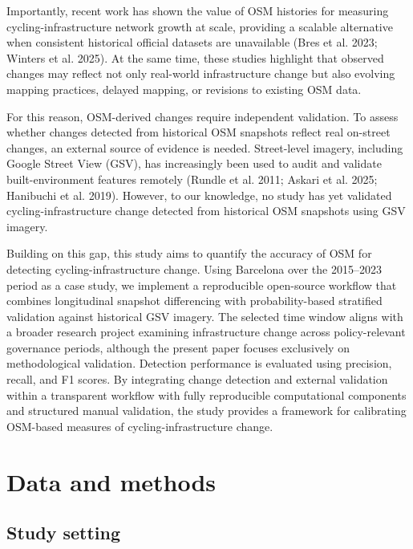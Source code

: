 \documentclass[
]{article}
\begin{document}
Importantly, recent work has shown the value of OSM histories for
measuring cycling-infrastructure network growth at scale, providing a
scalable alternative when consistent historical \color{black}official
datasets \color{black} are unavailable (Bres et al. 2023; Winters et al.
2025). At the same time, these studies highlight that observed changes
may reflect not only real-world infrastructure change but also evolving
mapping practices, delayed mapping, or revisions to existing OSM data.

For this reason, OSM-derived changes require independent validation. To
assess whether changes detected from historical OSM snapshots reflect
real on-street changes, an external source of evidence is needed.
Street-level imagery, including Google Street View (GSV), has
increasingly been used to audit and validate built-environment features
remotely (Rundle et al. 2011; Askari et al. 2025; Hanibuchi et al.
2019). However, to our knowledge, no study has yet validated
cycling-infrastructure change detected from historical OSM snapshots
using GSV imagery.

\color{black}Building on this gap, this study aims to quantify the
accuracy of OSM for detecting cycling-infrastructure change.
\color{black} Using Barcelona over the 2015--2023 period as a case
study, we implement a reproducible open-source workflow that combines
longitudinal snapshot differencing with probability-based stratified
validation against historical GSV imagery. The selected time window
aligns with a broader research project examining infrastructure change
across policy-relevant governance periods, although the present paper
focuses exclusively on methodological validation. Detection performance
is evaluated using precision, recall, and F1 scores. By integrating
change detection and external validation within a transparent
\color{black}workflow with fully reproducible computational components
and structured manual validation, the study provides a \color{black}
framework for calibrating OSM-based measures of cycling-infrastructure
change.

\section{Data and methods}\label{data-and-methods}

\subsection{Study setting}\label{study-setting}
\end{document}
